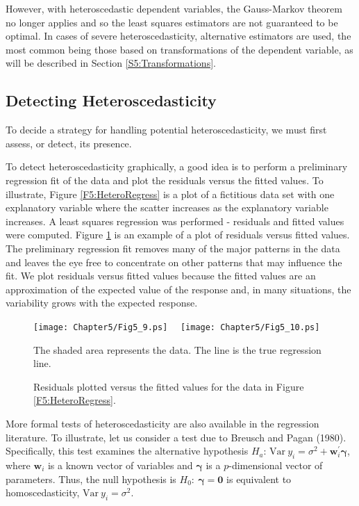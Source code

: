 However, with heteroscedastic dependent variables, the Gauss-Markov
theorem no longer applies and so the least squares estimators are
not guaranteed to be optimal. In cases of severe heteroscedasticity,
alternative estimators are used, the most common being those based
on transformations of the dependent variable, as will be described
in Section \ref{S5:Transformations}.

\subsection{Detecting Heteroscedasticity}

To decide a strategy for handling potential heteroscedasticity, we
must first assess, or detect, its presence.

To detect heteroscedasticity graphically, a good idea is to perform
a preliminary regression fit of the data and plot the residuals
versus the fitted values. To illustrate, Figure
\ref{F5:HeteroRegress} is a plot of a fictitious data set with one
explanatory variable where the scatter increases as the explanatory
variable increases. A least squares regression was performed -
residuals and fitted values were computed. Figure
\ref{F5:HeteroResid} is an example of a plot of residuals versus
fitted values. The preliminary regression fit removes many of the
major patterns in the data and leaves the eye free to concentrate on
other patterns that may influence the fit. We plot residuals versus
fitted values because the fitted values are an approximation of the
expected value of the response and, in many situations, the
variability grows with the expected response.


\begin{figure}[htp]
    \texttt{[image: Chapter5/Fig5\_9.ps]}
    $~~~$
    \texttt{[image: Chapter5/Fig5\_10.ps]}    \hfill
      \parbox[t]{2.5in}{\caption{\label{F5:HeteroRegress} \small  The shaded area
represents the data. The line is the true regression line.}} \hfill
        \parbox[t]{2.5in}{ \caption{\label{F5:HeteroResid} \small  Residuals plotted
versus the fitted values for the data in Figure
\ref{F5:HeteroRegress}.}}
\end{figure}

More formal tests of heteroscedasticity are also available in the
regression literature. To illustrate, let us consider a test due to
Breusch and Pagan (1980). Specifically, this test examines the
alternative hypothesis $H_a$: $\mathrm{Var~} y_i = \sigma^2 +
\mathbf{w}_i^{\prime} \boldsymbol \gamma $, where $\mathbf{w}_i$ is
a known vector of variables and $\boldsymbol \gamma$ is a
$p$-dimensional vector of parameters. Thus, the null hypothesis is
$H_0:~ \boldsymbol \gamma = \mathbf{0}$ is equivalent to
homoscedasticity,  $\mathrm{Var~} y_i = \sigma^2.$

